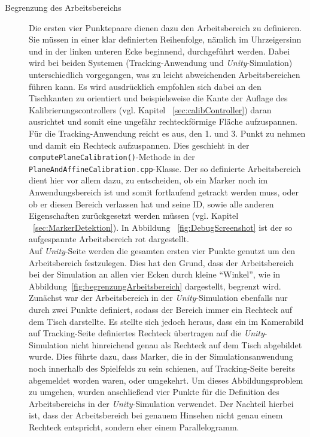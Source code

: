 \begin{description}
\item[Begrenzung des Arbeitsbereichs] Die ersten vier Punktepaare dienen dazu den Arbeitsbereich zu definieren. Sie müssen in einer klar definierten Reihenfolge, nämlich im Uhrzeigersinn und in der linken unteren Ecke beginnend, durchgeführt werden. Dabei wird bei beiden Systemen (Tracking-Anwendung und \emph{Unity}-Simulation) unterschiedlich vorgegangen, was zu leicht abweichenden Arbeitsbereichen führen kann. Es wird ausdrücklich empfohlen sich dabei an den Tischkanten zu orientiert und beispielsweise die Kante der Auflage des Kalibrierungscontrollers (vgl. Kapitel ~\ref{sec:calibController}) daran ausrichtet und somit eine ungefähr rechteckförmige Fläche aufzuspannen. \\
Für die Tracking-Anwendung reicht es aus, den 1. und 3. Punkt zu nehmen und damit ein Rechteck aufzuspannen. Dies geschieht in der \texttt{compute\-Plane\-Cali\-bration()}-Methode in der \texttt{Plane\-And\-Affine\-Calibration.cpp}-Klasse. Der so definierte Arbeitsbereich dient hier vor allem dazu, zu entscheiden, ob ein Marker noch im Anwendungsbereich ist und somit fortlaufend getrackt werden muss, oder ob er diesen Bereich verlassen hat und seine ID, sowie alle anderen Eigenschaften zurückgesetzt werden müssen (vgl. Kapitel ~\ref{sec:MarkerDetektion}). In Abbildung ~\ref{fig:DebugScreenshot} ist der so aufgespannte Arbeitsbereich rot dargestellt.\\
Auf \emph{Unity}-Seite werden die gesamten ersten vier Punkte genutzt um den Arbeitsbereich festzulegen. Dies hat den Grund, dass der Arbeitsbereich bei der Simulation an allen vier Ecken durch kleine "`Winkel"', wie in Abbildung~\ref{fig:begrenzungArbeitsbereich} dargestellt, begrenzt wird. Zunächst war der Arbeitsbereich in der \emph{Unity}-Simulation ebenfalls nur durch zwei Punkte definiert, sodass der Bereich immer ein Rechteck auf dem Tisch darstellte. Es stellte sich jedoch heraus, dass ein im Kamerabild auf Tracking-Seite definiertes Rechteck übertragen auf die \emph{Unity}-Simulation nicht hinreichend genau als Rechteck auf dem Tisch abgebildet wurde. Dies führte dazu, dass Marker, die in der Simulationsanwendung noch innerhalb des Spielfelds zu sein schienen, auf Tracking-Seite bereits abgemeldet worden waren, oder umgekehrt. Um dieses Abbildungsproblem zu umgehen, wurden anschließend vier Punkte für die Definition des Arbeitsbereichs in der \emph{Unity}-Simulation verwendet. Der Nachteil hierbei ist, dass der Arbeitsbereich bei genauem Hinsehen nicht genau einem Rechteck entspricht, sondern eher einem Parallelogramm.


\end{description}
